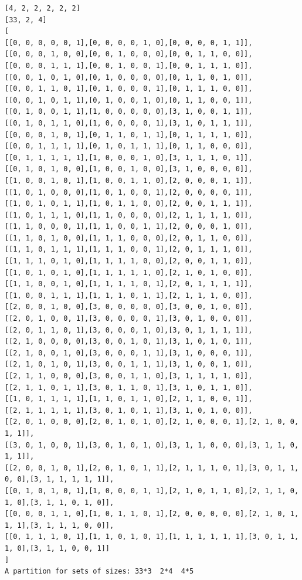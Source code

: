 \documentclass[final]{dmtcs-episciences}
\begin{document}
\begin{appendices}
\begin{verbatim} 
[4, 2, 2, 2, 2, 2]
[33, 2, 4]
[
[[0, 0, 0, 0, 0, 1],[0, 0, 0, 0, 1, 0],[0, 0, 0, 0, 1, 1]],
[[0, 0, 0, 1, 0, 0],[0, 0, 1, 0, 0, 0],[0, 0, 1, 1, 0, 0]],
[[0, 0, 0, 1, 1, 1],[0, 0, 1, 0, 0, 1],[0, 0, 1, 1, 1, 0]],
[[0, 0, 1, 0, 1, 0],[0, 1, 0, 0, 0, 0],[0, 1, 1, 0, 1, 0]],
[[0, 0, 1, 1, 0, 1],[0, 1, 0, 0, 0, 1],[0, 1, 1, 1, 0, 0]],
[[0, 0, 1, 0, 1, 1],[0, 1, 0, 0, 1, 0],[0, 1, 1, 0, 0, 1]],
[[0, 1, 0, 0, 1, 1],[1, 0, 0, 0, 0, 0],[3, 1, 0, 0, 1, 1]],
[[0, 1, 0, 1, 1, 0],[1, 0, 0, 0, 0, 1],[3, 1, 0, 1, 1, 1]],
[[0, 0, 0, 1, 0, 1],[0, 1, 1, 0, 1, 1],[0, 1, 1, 1, 1, 0]],
[[0, 0, 1, 1, 1, 1],[0, 1, 0, 1, 1, 1],[0, 1, 1, 0, 0, 0]],
[[0, 1, 1, 1, 1, 1],[1, 0, 0, 0, 1, 0],[3, 1, 1, 1, 0, 1]],
[[0, 1, 0, 1, 0, 0],[1, 0, 0, 1, 0, 0],[3, 1, 0, 0, 0, 0]],
[[1, 0, 0, 1, 0, 1],[1, 0, 0, 1, 1, 0],[2, 0, 0, 0, 1, 1]],
[[1, 0, 1, 0, 0, 0],[1, 0, 1, 0, 0, 1],[2, 0, 0, 0, 0, 1]],
[[1, 0, 1, 0, 1, 1],[1, 0, 1, 1, 0, 0],[2, 0, 0, 1, 1, 1]],
[[1, 0, 1, 1, 1, 0],[1, 1, 0, 0, 0, 0],[2, 1, 1, 1, 1, 0]],
[[1, 1, 0, 0, 0, 1],[1, 1, 0, 0, 1, 1],[2, 0, 0, 0, 1, 0]],
[[1, 1, 0, 1, 0, 0],[1, 1, 1, 0, 0, 0],[2, 0, 1, 1, 0, 0]],
[[1, 1, 0, 1, 1, 1],[1, 1, 1, 0, 0, 1],[2, 0, 1, 1, 1, 0]],
[[1, 1, 1, 0, 1, 0],[1, 1, 1, 1, 0, 0],[2, 0, 0, 1, 1, 0]],
[[1, 0, 1, 0, 1, 0],[1, 1, 1, 1, 1, 0],[2, 1, 0, 1, 0, 0]],
[[1, 1, 0, 0, 1, 0],[1, 1, 1, 1, 0, 1],[2, 0, 1, 1, 1, 1]],
[[1, 0, 0, 1, 1, 1],[1, 1, 1, 0, 1, 1],[2, 1, 1, 1, 0, 0]],
[[2, 0, 0, 1, 0, 0],[3, 0, 0, 0, 0, 0],[3, 0, 0, 1, 0, 0]],
[[2, 0, 1, 0, 0, 1],[3, 0, 0, 0, 0, 1],[3, 0, 1, 0, 0, 0]],
[[2, 0, 1, 1, 0, 1],[3, 0, 0, 0, 1, 0],[3, 0, 1, 1, 1, 1]],
[[2, 1, 0, 0, 0, 0],[3, 0, 0, 1, 0, 1],[3, 1, 0, 1, 0, 1]],
[[2, 1, 0, 0, 1, 0],[3, 0, 0, 0, 1, 1],[3, 1, 0, 0, 0, 1]],
[[2, 1, 0, 1, 0, 1],[3, 0, 0, 1, 1, 1],[3, 1, 0, 0, 1, 0]],
[[2, 1, 1, 0, 0, 0],[3, 0, 0, 1, 1, 0],[3, 1, 1, 1, 1, 0]],
[[2, 1, 1, 0, 1, 1],[3, 0, 1, 1, 0, 1],[3, 1, 0, 1, 1, 0]],
[[1, 0, 1, 1, 1, 1],[1, 1, 0, 1, 1, 0],[2, 1, 1, 0, 0, 1]],
[[2, 1, 1, 1, 1, 1],[3, 0, 1, 0, 1, 1],[3, 1, 0, 1, 0, 0]],
[[2, 0, 1, 0, 0, 0],[2, 0, 1, 0, 1, 0],[2, 1, 0, 0, 0, 1],[2, 1, 0, 0, 1, 1]],
[[3, 0, 1, 0, 0, 1],[3, 0, 1, 0, 1, 0],[3, 1, 1, 0, 0, 0],[3, 1, 1, 0, 1, 1]],
[[2, 0, 0, 1, 0, 1],[2, 0, 1, 0, 1, 1],[2, 1, 1, 1, 0, 1],[3, 0, 1, 1, 0, 0],[3, 1, 1, 1, 1, 1]],
[[0, 1, 0, 1, 0, 1],[1, 0, 0, 0, 1, 1],[2, 1, 0, 1, 1, 0],[2, 1, 1, 0, 1, 0],[3, 1, 1, 0, 1, 0]],
[[0, 0, 0, 1, 1, 0],[1, 0, 1, 1, 0, 1],[2, 0, 0, 0, 0, 0],[2, 1, 0, 1, 1, 1],[3, 1, 1, 1, 0, 0]],
[[0, 1, 1, 1, 0, 1],[1, 1, 0, 1, 0, 1],[1, 1, 1, 1, 1, 1],[3, 0, 1, 1, 1, 0],[3, 1, 1, 0, 0, 1]]
]
A partition for sets of sizes: 33*3  2*4  4*5
\end{verbatim}
\newpage


\end{appendices}
\end{document}
